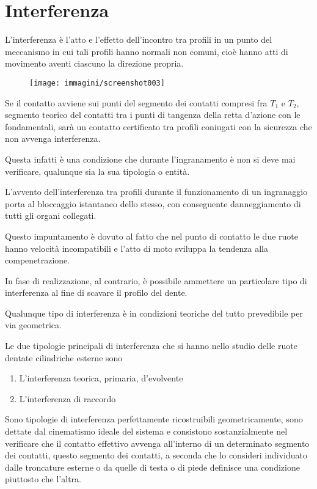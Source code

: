 \documentclass[a4paper, 15pt]{article}
\begin{document}
\section{Interferenza}		
\begin{adjustwidth}{2in}{} 		
		L'interferenza è l'atto e l'effetto dell'incontro tra profili in un punto del meccanismo in cui tali profili hanno normali non comuni, cioè hanno atti di movimento aventi ciascuno la direzione propria.
		\begin{figure}[H]
			\centering
			\texttt{[image: immagini/screenshot003]}
			\label{fig:screenshot003}
		\end{figure}		
		Se il contatto avviene sui punti del segmento dei contatti compresi fra $T_1$ e $T_2$, segmento teorico del contatti tra i punti di tangenza della retta d'azione con le fondamentali, sarà un contatto certificato tra profili coniugati con la sicurezza che non avvenga interferenza.
		
		Questa infatti è una condizione che durante l'ingranamento è non si deve mai verificare, qualunque sia la sua tipologia o entità. \newline
		
		L'avvento dell'interferenza tra profili durante il funzionamento di un ingranaggio porta al bloccaggio istantaneo dello stesso, con conseguente danneggiamento di tutti gli organi collegati.
		
		Questo impuntamento è dovuto al fatto che nel punto di contatto le due ruote hanno velocità incompatibili e l'atto di moto sviluppa la tendenza alla compenetrazione. 
		
		In fase di realizzazione, al contrario, è possibile ammettere un particolare tipo di interferenza al fine di scavare il profilo del dente. \newline
			
		Qualunque tipo di interferenza è in condizioni teoriche del tutto prevedibile per via geometrica. 
		
		Le due tipologie principali di interferenza che si hanno nello studio delle ruote dentate cilindriche esterne sono
		\begin{enumerate}
			\item L'interferenza teorica, primaria, d'evolvente
			\item L'interferenza di raccordo
		\end{enumerate}
		Sono tipologie di interferenza perfettamente ricostruibili geometricamente, sono dettate dal cinematismo ideale del sistema e consistono sostanzialmente nel verificare che il contatto effettivo avvenga all'interno di un determinato segmento dei contatti, questo segmento dei contatti, a seconda che lo consideri individuato dalle troncature esterne o da quelle di testa o di piede definisce una  condizione piuttosto che l'altra. 
\end{adjustwidth}
\newpage
\end{document}
